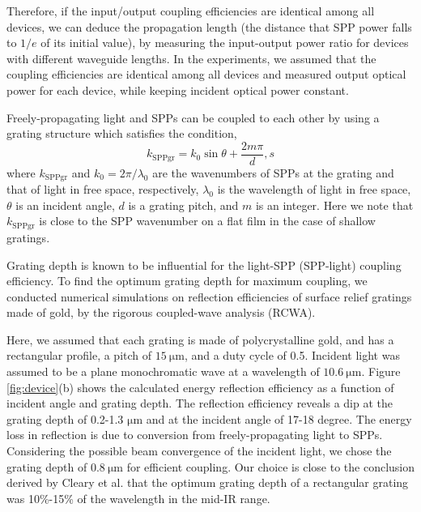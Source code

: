 \documentclass[aip,apl,reprint]{revtex4-1}
\begin{document}
Therefore, if the input/output coupling efficiencies are identical among all devices, we can deduce the propagation length (the distance that SPP power falls to $1/e$ of its initial value), by measuring the input-output power ratio for devices with different waveguide lengths.  In the experiments, we assumed that the coupling efficiencies are identical among all devices and measured output optical power for each device, while keeping incident optical power constant. 

Freely-propagating light and SPPs can be coupled to each other by using a grating structure which satisfies the condition\cite{Koev},
\begin{equation}
k_{\mathrm{SPPgr}}=k_0 \sin \theta + \frac{2m\pi}{d},
\label{eq:phase-match}s
\end{equation}
where $k_{\mathrm{SPPgr}}$ and $k_0=2\pi/\lambda_0$ are the wavenumbers of SPPs at the grating and that of light in free space, respectively, $\lambda_0$ is the wavelength of light in free space, $\theta$ is an incident angle, $d$ is a grating pitch, and $m$ is an integer. Here we note that $k_{\mathrm{SPPgr}}$ is close to the SPP wavenumber on a flat film in the case of shallow gratings.

Grating depth is known to be influential for the light-SPP (SPP-light) coupling efficiency\cite{Koev, Cleary2010}. To find the optimum grating depth for maximum coupling, we conducted numerical simulations on reflection efficiencies of surface relief gratings made of gold, by the rigorous coupled-wave analysis (RCWA)\cite{Moharam}. 

Here, we assumed that each grating is made of polycrystalline gold, and has a rectangular profile, a pitch of $15\:\mathrm{\mu m}$, and a duty cycle of 0.5. Incident light was assumed to be a plane monochromatic wave at a wavelength of $10.6\:\mathrm{\mu m}$. 
Figure \ref{fig:device}(b) shows the calculated energy reflection efficiency as a function of incident angle and grating depth. The reflection efficiency reveals a dip at the grating depth of 0.2-1.3 $\mathrm{\mu m}$ and at the incident angle of 17-18 degree. The energy loss in reflection is due to conversion from freely-propagating light to SPPs.
Considering the possible beam convergence of the incident light, we chose the grating depth of $0.8\:\mathrm{\mu m}$ for efficient coupling. Our choice is close to the conclusion derived by Cleary et al.\cite{Cleary2010} that the optimum grating depth of a rectangular grating was 10\%-15\% of the wavelength in the mid-IR range.
\end{document}
